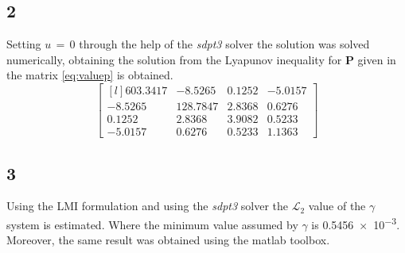 \subsection{2}
Setting \(u\,=\,0\) through the help of the \emph{sdpt3} solver the solution
was solved numerically, obtaining the solution from the Lyapunov inequality for
 \(\mathbf{P}\) given in the matrix \eqref{eq:valuep} is obtained.
 \begin{equation}
 	\label{eq:valuep}
 	\begin{bmatrix*}[l]
 		603.3417	&   -8.5265	&    0.1252	&   -5.0157\\[5pt]
		-8.5265	&  128.7847	&    2.8368	&    0.6276\\[5pt]
		0.1252	&    2.8368	&    3.9082	&    0.5233\\[5pt]
		-5.0157	&    0.6276	&    0.5233	&    1.1363
	\end{bmatrix*}
\end{equation}

\subsection{3}
Using the LMI formulation and using the \emph{sdpt3} solver the \(\mathcal{L}_{2}\)
value of the \(\gamma\) system is estimated.
Where the minimum value assumed by \(\gamma\) is \num{0.5456e-3}.
Moreover, the same result was obtained using the matlab toolbox.

